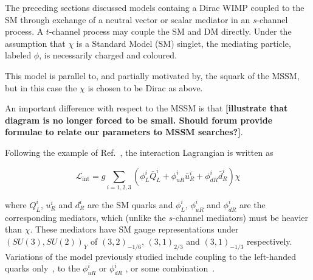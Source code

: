 

The preceding sections discussed models containg a Dirac WIMP coupled to the SM through exchange of a neutral vector or scalar mediator in an $s$-channel process. A $t$-channel process may couple the SM and DM directly. Under the assumption that $\chi$ is a Standard Model (SM) singlet, the mediating particle, labeled $\phi$, is necessarily charged and coloured. 

This model is parallel to, and partially motivated by, the squark of the MSSM, but in this case the $\chi$ is chosen to be Dirac as above. 

An important difference with respect to the MSSM is that {\bf [illustrate that diagram is no longer forced to be small. Should forum provide formulae to relate our parameters to MSSM searches?]}. 

Following the example of Ref.~\cite{Papucci:2014}, the interaction Lagrangian is written as

\begin{equation}
\mathcal{L}_{\mathrm{int}} = g \sum_{i=1,2,3} (\phi_L^i \bar{Q}_L^i + \phi_{uR}^i \bar{u}_R^i + \phi_{dR}^i \bar{d}_R^i) \chi
\end{equation}

where $Q_L^i$, $u_R^i$ and $d_R^i$ are the SM quarks and $\phi_L^i$, $\phi_{uR}^i$ and $\phi_{dR}^i$ are the corresponding mediators, which (unlike the $s$-channel mediators) must be heavier than $\chi$. These mediators have SM gauge representations under $(SU(3), SU(2))_Y$ of $(3,2)_{-1/6}$, $(3,1)_{2/3}$ and $(3,1)_{-1/3}$ respectively. Variations of the model previously studied include coupling to the left-handed quarks only~\cite{Chang:2014, Busoni:2014haa}, to the $\phi_{uR}^i$ \cite{Tait:2013} or $\phi_{dR}^i$ \cite{Papucci:2014, Yavin:14092893}, or some combination~\cite{Bai:201311171, An:201489115014}.

